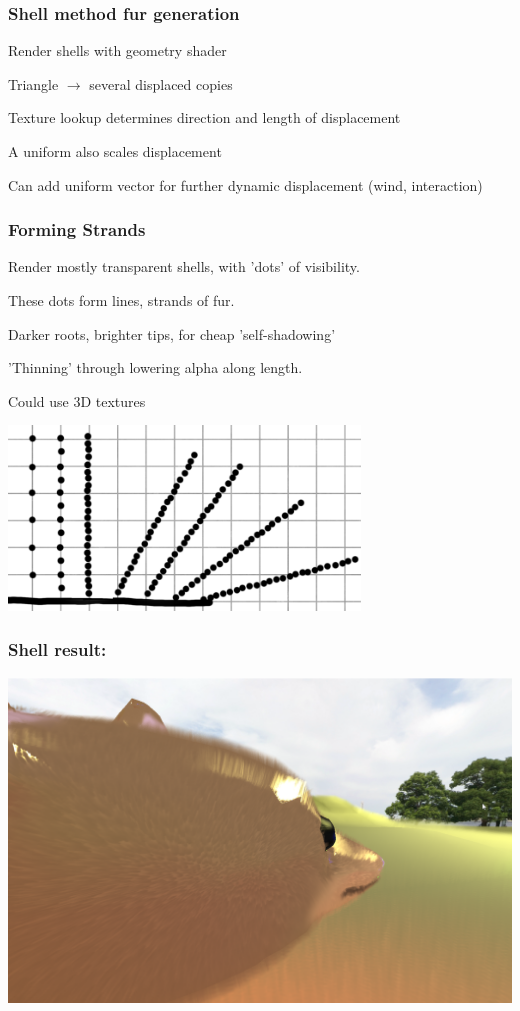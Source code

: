 \documentclass[12pt]{beamer}
\begin{document}
    \begin{frame}
        \frametitle{ Shell method fur generation }
        Render shells with geometry shader

        Triangle $\rightarrow$ several displaced copies

        Texture lookup determines direction and length of displacement

        A uniform also scales displacement
        
        Can add uniform vector for further dynamic displacement (wind, interaction)
        
    \end{frame}
    
    \begin{frame}
        \frametitle{ Forming Strands }
        Render mostly transparent shells, with 'dots' of visibility.

        These dots form lines, strands of fur.

        Darker roots, brighter tips, for cheap 'self-shadowing'

        'Thinning' through lowering alpha along length.

        Could use 3D textures
        \vspace{0.5em}

        \includegraphics[width=0.7\textwidth]{dotsformlines}
    \end{frame}

    \begin{frame}
        \frametitle{ Shell result: }

        \includegraphics[width=\textwidth]{shells}
    \end{frame}
\end{document}
